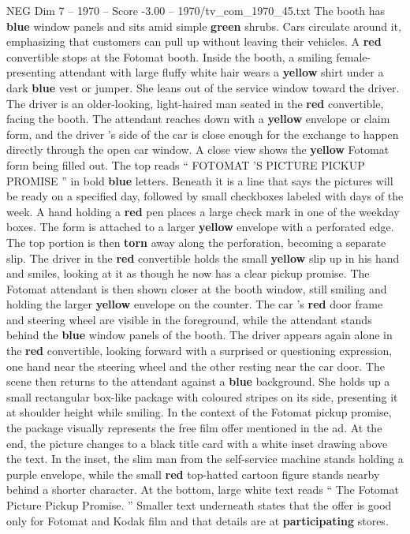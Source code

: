\begin{textsample}{NEG Dim 7 – 1970 – Score -3.00 – 1970/tv\_com\_1970\_45.txt}
The booth has \textbf{blue} window panels and sits amid simple \textbf{green} shrubs.
Cars circulate around it, emphasizing that customers can pull up without leaving their vehicles.
A \textbf{red} convertible stops at the Fotomat booth.
Inside the booth, a smiling female-presenting attendant with large fluffy white hair wears a \textbf{yellow} shirt under a dark \textbf{blue} vest or jumper.
She leans out of the service window toward the driver.
The driver is an older-looking, light-haired man seated in the \textbf{red} convertible, facing the booth.
The attendant reaches down with a \textbf{yellow} envelope or claim form, and the driver ’s side of the car is close enough for the exchange to happen directly through the open car window.
A close view shows the \textbf{yellow} Fotomat form being filled out.
The top reads “ FOTOMAT ’S PICTURE PICKUP PROMISE ” in bold \textbf{blue} letters.
Beneath it is a line that says the pictures will be ready on a specified day, followed by small checkboxes labeled with days of the week.
A hand holding a \textbf{red} pen places a large check mark in one of the weekday boxes.
The form is attached to a larger \textbf{yellow} envelope with a perforated edge.
The top portion is then \textbf{torn} away along the perforation, becoming a separate slip.
The driver in the \textbf{red} convertible holds the small \textbf{yellow} slip up in his hand and smiles, looking at it as though he now has a clear pickup promise.
The Fotomat attendant is then shown closer at the booth window, still smiling and holding the larger \textbf{yellow} envelope on the counter.
The car ’s \textbf{red} door frame and steering wheel are visible in the foreground, while the attendant stands behind the \textbf{blue} window panels of the booth.
The driver appears again alone in the \textbf{red} convertible, looking forward with a surprised or questioning expression, one hand near the steering wheel and the other resting near the car door.
The scene then returns to the attendant against a \textbf{blue} background.
She holds up a small rectangular box-like package with coloured stripes on its side, presenting it at shoulder height while smiling.
In the context of the Fotomat pickup promise, the package visually represents the free film offer mentioned in the ad.
At the end, the picture changes to a black title card with a white inset drawing above the text.
In the inset, the slim man from the self-service machine stands holding a purple envelope, while the small \textbf{red} top-hatted cartoon figure stands nearby behind a shorter character.
At the bottom, large white text reads “ The Fotomat Picture Pickup Promise. ” Smaller text underneath states that the offer is good only for Fotomat and Kodak film and that details are at \textbf{participating} stores.

\end{textsample}
